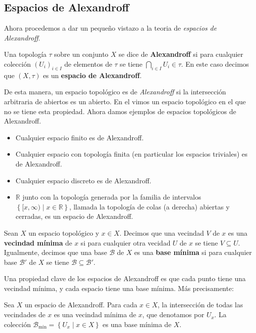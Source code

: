 \subsection{Espacios de Alexandroff}\label{subsec:Alexandroff}
Ahora procedemos a dar un pequeño vistazo a la teoria de \textit{espacios de Alexandroff}.
\begin{Def}
   Una topología $\tau$ sobre un conjunto $X$ se dice de \textbf{Alexandroff} si para cualquier colección $\left( U_i\right)_{i\in I}$ de elementos de $\tau$ se tiene $\bigcap_{i\in I}U_i \in\tau$. En este caso decimos que $(X,\tau)$ es un \textbf{espacio de Alexandroff}.
\end{Def}
De esta manera, un espacio topológico es de \textit{Alexandroff} si la intersección arbitraria de abiertos es un abierto. En el  vimos un espacio topológico en el que no se tiene esta propiedad. Ahora damos ejemplos de espacios topológicos de Alexandroff.
\begin{Ejm}
   \phantom{o}
   \begin{itemize}
      \item Cualquier espacio finito es de Alexandroff.
      \item Cualquier espacio con topología finita (en particular los espacios triviales) es de Alexandroff.
      \item Cualquier espacio discreto es de Alexandroff.
      \item $\mathbb{R}$ junto con la topología generada por la familia de intervalos $\left\lbrace [x,\infty)\mid x\in \mathbb{R}\right\rbrace$, llamada la topología de colas (a derecha) abiertas y cerradas, es un espacio de Alexandroff.
   \end{itemize}
\end{Ejm}
\begin{Def}
   Sean $X$ un espacio topológico y $x\in X$. Decimos que una vecindad $V$ de $x$ es una \textbf{vecindad mínima} de $x$ si para cualquier otra vecidad $U$ de $x$ se tiene $V\subseteq U$. Igualmente, decimos que una base $\mathcal{B}$ de $X$ es una \textbf{base mínima} si para cualquier base $\mathcal{B}'$ de $X$ se tiene $\mathcal{B}\subseteq\mathcal{B}'$.
\end{Def}
Una propiedad clave de los espacios de Alexandroff es que cada punto tiene una vecindad mínima, y cada espacio tiene una base mínima. Más precisamente:
\begin{Prop}
   Sea $X$ un espacio de Alexandroff. Para cada $x\in X$, la intersección de todas las vecindades de $x$ es una vecindad mínima de $x$, que denotamos por $U_x$. La colección $\mathcal{B}_{\operatorname{min}}=\left\lbrace U_x\mid x\in X\right\rbrace$ es una base mínima de $X$.
\end{Prop}
